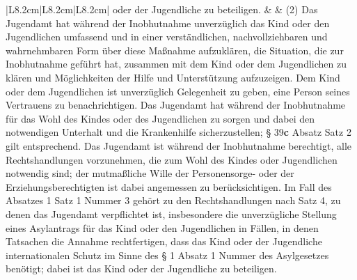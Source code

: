 \documentclass[10pt,a4paper,landscape]{article}
\begin{document}
\begin{longtable}{|L{8.2cm}|L{8.2cm}|L{8.2cm}|}
oder der Jugendliche zu beteiligen. &  & (2) Das Jugendamt hat während der  \newline Inobhutnahme unverzüglich das Kind oder  \newline den Jugendlichen umfassend und in einer  \newline verständlichen, nachvollziehbaren und  \newline wahrnehmbaren Form über diese  \newline Maßnahme aufzuklären, die Situation, die  \newline zur Inobhutnahme geführt hat, zusammen  \newline mit dem Kind oder dem Jugendlichen zu  \newline klären und Möglichkeiten der Hilfe und  \newline Unterstützung aufzuzeigen. Dem Kind oder  \newline dem Jugendlichen ist unverzüglich  \newline Gelegenheit zu geben, eine Person seines  \newline Vertrauens zu benachrichtigen. Das  \newline Jugendamt hat während der Inobhutnahme  für das Wohl des Kindes oder des  \newline Jugendlichen zu sorgen und dabei den  \newline notwendigen Unterhalt und die  \newline Krankenhilfe sicherzustellen; \S{} \textcolor{diffgreen}{39}\textbf{\textcolor{diffgreen}{c}} Absatz   Satz 2 gilt entsprechend. Das Jugendamt  \newline ist während der Inobhutnahme berechtigt,  \newline alle Rechtshandlungen vorzunehmen, die  \newline zum Wohl des Kindes oder Jugendlichen  \newline notwendig sind; der mutmaßliche Wille der  \newline Personensorge- oder der  \newline Erziehungsberechtigten ist dabei  \newline angemessen zu berücksichtigen. Im Fall  \newline des Absatzes 1 Satz 1 Nummer 3 gehört  \newline zu den Rechtshandlungen nach Satz 4, zu  \newline denen das Jugendamt verpflichtet ist,  \newline insbesondere die unverzügliche Stellung  \newline eines Asylantrags für das Kind oder den  \newline Jugendlichen in Fällen, in denen Tatsachen  \newline die Annahme rechtfertigen, dass das Kind  \newline oder der Jugendliche internationalen  \newline Schutz im Sinne des \S{} 1 Absatz 1 Nummer   des Asylgesetzes benötigt; dabei ist das  \newline Kind oder der Jugendliche zu beteiligen. \\

\end{longtable}
\end{document}
